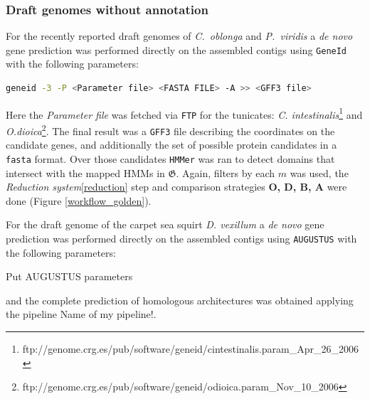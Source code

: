 \documentclass[11pt]{article}
\newcommand{\TODO}[1]{\begingroup\color{red}#1\endgroup}
\begin{document}
\subsubsection*{Draft genomes without annotation}

For the recently reported draft genomes of \textit{C.\ oblonga} and 
\textit{P.\ viridis} a \textit{de novo} gene prediction was performed 
directly on the assembled contigs using \texttt{GeneId} \cite{} 
with the following parameters:

\begin{lstlisting}[language=bash, breaklines=true]
geneid -3 -P <Parameter file> <FASTA FILE> -A >> <GFF3 file>
\end{lstlisting}

Here the \textit{Parameter file} was fetched via \texttt{FTP} for the 
tunicates: \textsl{C. intestinalis}\footnote{
ftp://genome.crg.es/pub/software/geneid/cintestinalis.param\_Apr\_26\_2006} and 
\textsl{O.dioica}\footnote{
ftp://genome.crg.es/pub/software/geneid/odioica.param\_Nov\_10\_2006}. The final 
result was a \texttt{GFF3} file describing the coordinates on the candidate 
genes, and additionally the set of possible protein candidates in a 
\texttt{fasta} format. Over those candidates \texttt{HMMer} was ran to detect 
domains that intersect with the mapped HMMs in $\boldsymbol{\mathfrak{G}}$. 
Again, filters by each $m$ was used, the \textsl{Reduction 
system}\ref{reduction} step and comparison strategies \textbf{O, D, B, A} were 
done (Figure \ref{workflow_golden}).

For the draft genome of the carpet sea squirt \textit{D. vexillum} 
\cite{velandia2016a} a \textit{de novo} gene prediction was performed 
directly on the assembled contigs using \texttt{AUGUSTUS} \cite{augustus} 
with the following parameters:

\TODO{Put AUGUSTUS parameters}

and the complete prediction of homologous architectures was obtained applying 
the pipeline \TODO{Name of my pipeline!}.
\end{document}
